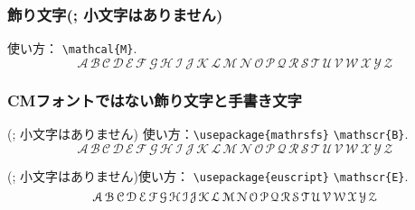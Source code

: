 
\subsubsection{飾り文字(; 小文字はありません)}
使い方：
\verb'\mathcal{M}'.
\[
\mathcal{A}\,\mathcal{B}\,\mathcal{C}\,\mathcal{D}\,\mathcal{E}
\,\mathcal{F}\,\mathcal{G}\,\mathcal{H}\,\mathcal{I}\,\mathcal{J}
\,\mathcal{K}\,\mathcal{L}\,\mathcal{M}\,\mathcal{N}\,\mathcal{O}
\,\mathcal{P}\,\mathcal{Q}\,\mathcal{R}\,\mathcal{S}\,\mathcal{T}
\,\mathcal{U}\,\mathcal{V}\,\mathcal{W}\,\mathcal{X}\,\mathcal{Y}
\,\mathcal{Z}
\]

\subsubsection{CMフォントではない飾り文字と手書き文字}
(; 小文字はありません) 使い方：\verb'\usepackage{mathrsfs}' \verb'\mathscr{B}'.
\[
\mathscr{A}\,\mathscr{B}\,\mathscr{C}\,\mathscr{D}\,\mathscr{E}
\,\mathscr{F}\,\mathscr{G}\,\mathscr{H}\,\mathscr{I}\,\mathscr{J}
\,\mathscr{K}\,\mathscr{L}\,\mathscr{M}\,\mathscr{N}\,\mathscr{O}
\,\mathscr{P}\,\mathscr{Q}\,\mathscr{R}\,\mathscr{S}\,\mathscr{T}
\,\mathscr{U}\,\mathscr{V}\,\mathscr{W}\,\mathscr{X}\,\mathscr{Y}
\,\mathscr{Z}
\]

\begingroup
\noindent
(; 小文字はありません)使い方： \verb'\usepackage{euscript}' \verb'\mathscr{E}'.
\renewcommand{\mathscr}{\EuScript}
\[
\mathscr{A}\,\mathscr{B}\,\mathscr{C}\,\mathscr{D}\,\mathscr{E}
\,\mathscr{F}\,\mathscr{G}\,\mathscr{H}\,\mathscr{I}\,\mathscr{J}
\,\mathscr{K}\,\mathscr{L}\,\mathscr{M}\,\mathscr{N}\,\mathscr{O}
\,\mathscr{P}\,\mathscr{Q}\,\mathscr{R}\,\mathscr{S}\,\mathscr{T}
\,\mathscr{U}\,\mathscr{V}\,\mathscr{W}\,\mathscr{X}\,\mathscr{Y}
\,\mathscr{Z}
\]
\endgroup

